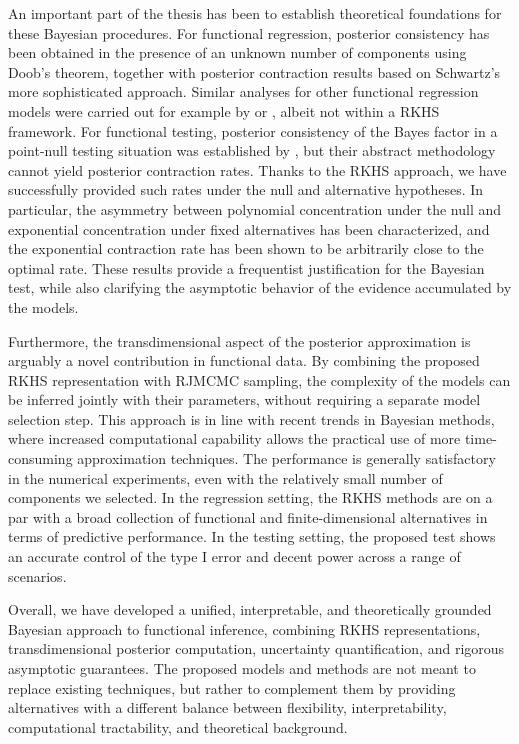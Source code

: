 An important part of the thesis has been to establish theoretical foundations for these Bayesian procedures. For functional regression, posterior consistency has been obtained in the presence of an unknown number of components using Doob's theorem, together with posterior contraction results based on Schwartz's more sophisticated approach. Similar analyses for other functional regression models were carried out for example by \citet{lian2016posterior} or \citet{abraham2020posterior}, albeit not within a \acs{RKHS} framework. For functional testing, posterior consistency of the Bayes factor in a point-null testing situation was established by \citet{dass2004note}, but their abstract methodology cannot yield posterior contraction rates. Thanks to the \acs{RKHS} approach, we have successfully provided such rates under the null and alternative hypotheses. In particular, the asymmetry between polynomial concentration under the null and exponential concentration under fixed alternatives has been characterized, and the exponential contraction rate has been shown to be arbitrarily close to the optimal rate. These results provide a frequentist justification for the Bayesian test, while also clarifying the asymptotic behavior of the evidence accumulated by the models.

Furthermore, the transdimensional aspect of the posterior approximation is arguably a novel contribution in functional data. By combining the proposed \acs{RKHS} representation with \acs{RJMCMC} sampling, the complexity of the models can be inferred jointly with their parameters, without requiring a separate model selection step. This approach is in line with recent trends in Bayesian methods, where increased computational capability allows the practical use of more time-consuming approximation techniques. The performance is generally satisfactory in the numerical experiments, even with the relatively small number of components we selected. In the regression setting, the \acs{RKHS} methods are on a par with a broad collection of functional and finite-dimensional alternatives in terms of predictive performance. In the testing setting, the proposed test shows an accurate control of the type I error and decent power across a range of scenarios.

Overall, we have developed a unified, interpretable, and theoretically grounded Bayesian approach to functional inference, combining \acs{RKHS} representations, transdimensional posterior computation, uncertainty quantification, and rigorous asymptotic guarantees. The proposed models and methods are not meant to replace existing techniques, but rather to complement them by providing alternatives with a different balance between flexibility, interpretability, computational tractability, and theoretical background.

